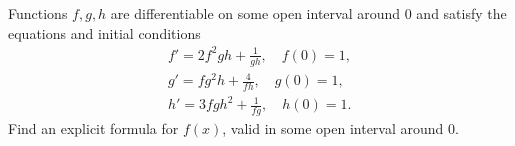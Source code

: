 Functions $f,g,h$ are differentiable on some open interval around $0$
and satisfy the equations and initial conditions
\begin{gather*}
f' = 2f^2gh+\frac{1}{gh},\quad f(0)=1, \\
g'=fg^2h+\frac{4}{fh}, \quad g(0)=1, \\
h'=3fgh^2+\frac{1}{fg}, \quad h(0)=1.
\end{gather*}
Find an explicit formula for $f(x)$, valid in some open interval around $0$.

